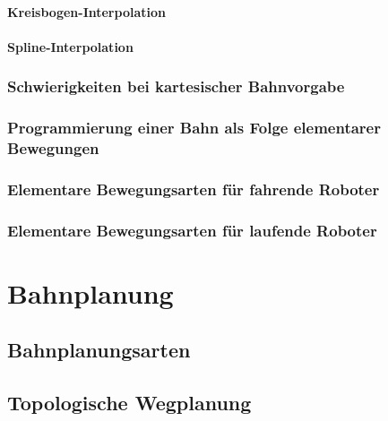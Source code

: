 \documentclass[a4paper, 11pt, accentcolor = tud3b]{tudreport}
\begin{document}
				\subsubsection{Kreisbogen-Interpolation} %

				\subsubsection{Spline-Interpolation} %

			\subsection{Schwierigkeiten bei kartesischer Bahnvorgabe} %

			\subsection{Programmierung einer Bahn als Folge elementarer Bewegungen} %

			\subsection{Elementare Bewegungsarten für fahrende Roboter} %

			\subsection{Elementare Bewegungsarten für laufende Roboter} %

	\chapter{Bahnplanung} %

		\section{Bahnplanungsarten} %

		\section{Topologische Wegplanung} %
\end{document}
